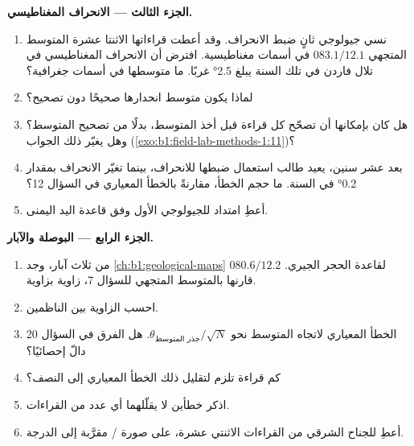 \begin{problem}
\medskip
\noindent\textbf{الجزء الثالث --- الانحراف المغناطيسي.}
\begin{enumerate}[resume]
  \item نسي جيولوجي ثانٍ ضبط الانحراف. وقد أعطت قراءاتها الاثنتا عشرة المتوسط المتجهي $083.1/12.1$ في أسمات مغناطيسية. افترض أن الانحراف المغناطيسي في تلال فاردن في تلك السنة يبلغ \ang{2.5} غربًا. ما متوسطها في أسمات جغرافية؟
  \item لماذا يكون متوسط انحدارها صحيحًا دون تصحيح؟
  \item هل كان بإمكانها أن تصحّح كل قراءة قبل أخذ المتوسط، بدلًا من تصحيح المتوسط؟ وهل يغيّر ذلك الجواب (\cref{exo:b1:field-lab-methods-1:11})؟
  \item بعد عشر سنين، يعيد طالب استعمال ضبطها للانحراف، بينما تغيّر الانحراف بمقدار \ang{0.2} في السنة. ما حجم الخطأ، مقارنةً بالخطأ المعياري في السؤال 12؟
  \item أعطِ امتداد  للجيولوجي الأول وفق قاعدة اليد اليمنى.
\end{enumerate}

\medskip
\noindent\textbf{الجزء الرابع --- البوصلة والآبار.}
\begin{enumerate}[resume]
  \item من ثلاث آبار، وجد \cref{ch:b1:geological-maps}  $080.6/12.2$ لقاعدة الحجر الجيري. قارنها بالمتوسط المتجهي للسؤال 7، زاوية بزاوية.
  \item احسب الزاوية بين الناظمين.
  \item الخطأ المعياري لاتجاه المتوسط نحو $\theta_{\text{جذر المتوسط}}/\sqrt N$. هل الفرق في السؤال 20 دالّ إحصائيًا؟
  \item كم قراءة تلزم لتقليل ذلك الخطأ المعياري إلى النصف؟
  \item اذكر خطأين لا يقلّلهما أي عدد من القراءات.
  \item أعطِ  للجناح الشرقي من القراءات الاثنتي عشرة، على صورة / مقرَّبة إلى الدرجة.
\end{enumerate}
\end{problem}
